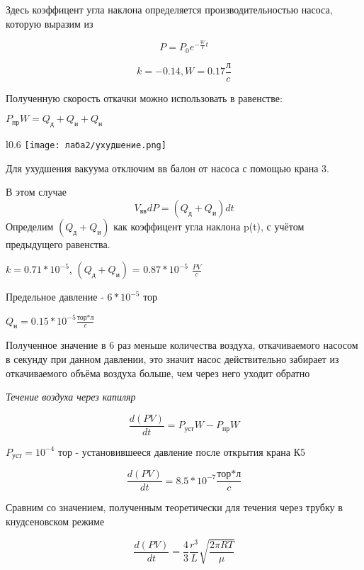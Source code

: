 \documentclass[a4paper]{article}
\begin{document}
Здесь коэффицент угла наклона определяется производительностью насоса, 
которую выразим из

\[P = P_0 e^{-\frac{W}{V}t}\]

\[k = -0.14, W = 0.17 \frac{\text{л}}{c}\]

Полученную скорость откачки можно использовать в равенстве:

$P_{\text{пр}}W = Q_{\text{д}} + Q_{\text{и}} + Q_{\text{н}}$
\vspace{2pt}


\begin{wrapfigure}{l}{0.6\textwidth}
    \centering
    \texttt{[image: лаба2/ухудшение.png]}
    \caption{$P, 10^{-5}\text{тор};\hspace{5pt} t, c$}
\end{wrapfigure}
\vspace{7pt}

Для ухудшения вакуума отключим вв балон от насоса с помощью крана 3.

В этом случае 
\[V_{\text{вв}}dP = (Q_{\text{д}} + Q_{\text{и}})dt\]
Определим
$(Q_{\text{д}} + Q_{\text{и}})$ как коэффицент угла наклона p(t), с учётом предыдущего равенства.\par

$k = 0.71 * 10^{-5}$, $(Q_{\text{д}} + Q_{\text{и}})$ = $0.87 * 10^{-5}$ $\frac{PV}{c}$

Предельное давление - $6 * 10^{-5}$ тор
\vspace{5pt}

$Q_{\text{н}} = 0.15 * 10^{-5} \frac{\text{тор*л}}{c}$

\vspace{5pt}
Полученное значение в 6 раз меньше количества воздуха, откачиваемого насосом в секунду при данном давлении,
это значит насос действительно забирает из откачиваемого объёма воздуха больше, чем
через него уходит обратно  


\pagebreak

\textit{Течение воздуха через капиляр}

\[\frac{d(PV)}{dt} = P_{\text{уст}}W - P_{\text{пр}}W\]

$P_{\text{уст}} = 10^{-4}$ тор - установившееся давление после открытия крана К5 

\[\frac{d(PV)}{dt} = 8.5  * 10^{-7} \frac{\text{тор*л}}{c}\]

Сравним со значением, полученным теоретически для течения через трубку в кнудсеновском режиме

\[\frac{d(PV)}{dt} = \frac{4}{3}\frac{r^3}{L}\sqrt{\frac{2\pi{RT}}{\mu}}\]
\end{document}
